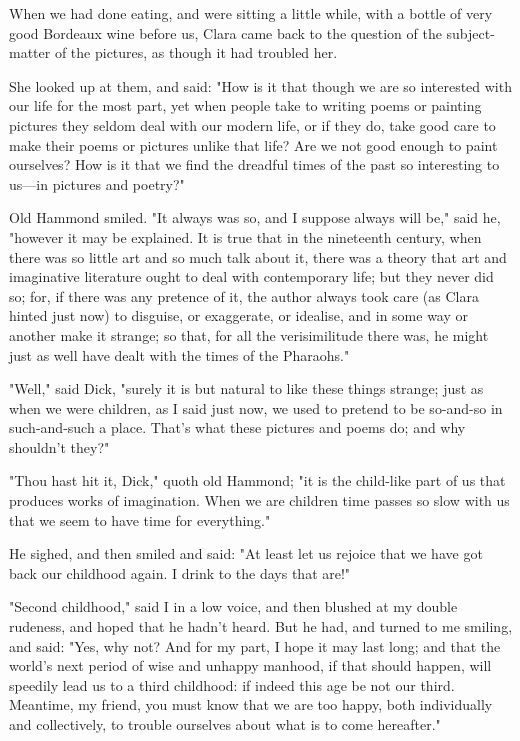 When we had done eating, and were sitting a little while, with a bottle
of very good Bordeaux wine before us, Clara came back to the question of
the subject-matter of the pictures, as though it had troubled her.

She looked up at them, and said: "How is it that though we are so
interested with our life for the most part, yet when people take to
writing poems or painting pictures they seldom deal with our modern
life, or if they do, take good care to make their poems or pictures
unlike that life? Are we not good enough to paint ourselves? How is it
that we find the dreadful times of the past so interesting to us---in
pictures and poetry?"

Old Hammond smiled. "It always was so, and I suppose always will be,"
said he, "however it may be explained. It is true that in the nineteenth
century, when there was so little art and so much talk about it, there
was a theory that art and imaginative literature ought to deal with
contemporary life; but they never did so; for, if there was any pretence
of it, the author always took care (as Clara hinted just now) to
disguise, or exaggerate, or idealise, and in some way or another make it
strange; so that, for all the verisimilitude there was, he might just as
well have dealt with the times of the Pharaohs."

"Well," said Dick, "surely it is but natural to like these things
strange; just as when we were children, as I said just now, we used to
pretend to be so-and-so in such-and-such a place. That's what these
pictures and poems do; and why shouldn't they?"

"Thou hast hit it, Dick," quoth old Hammond; "it is the child-like part
of us that produces works of imagination. When we are children time
passes so slow with us that we seem to have time for everything."

He sighed, and then smiled and said: "At least let us rejoice that we
have got back our childhood again. I drink to the days that are!"

"Second childhood," said I in a low voice, and then blushed at my double
rudeness, and hoped that he hadn't heard. But he had, and turned to me
smiling, and said: "Yes, why not? And for my part, I hope it may last
long; and that the world's next period of wise and unhappy manhood, if
that should happen, will speedily lead us to a third childhood: if
indeed this age be not our third. Meantime, my friend, you must know
that we are too happy, both individually and collectively, to trouble
ourselves about what is to come hereafter."


